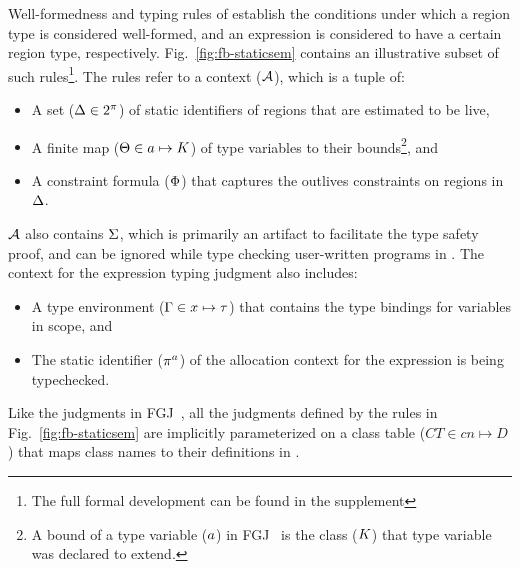 Well-formedness and typing rules of \fbname establish the conditions
under which a region type is considered well-formed, and an expression
is considered to have a certain region type, respectively.
Fig.~\ref{fig:fb-staticsem} contains an illustrative subset of such
rules\footnote{The full formal development can be found in the
supplement}. The rules refer to a context (${\mathcal{A}}$), which is a tuple of:
\begin{itemize}
\item A set ($\Delta \in 2^\pi$) of static identifiers of regions
that are estimated to be live,
\item A finite map ($\Theta \in a \mapsto K$) of type
variables to their bounds\footnote{A bound of a type variable
($a$) in FGJ~\cite{fgj} is the class ($K$) that type variable
was declared to extend.}, and
\item A constraint formula ($\Phi$) that captures the outlives
constraints on regions in $\Delta$.
\end{itemize}
${\mathcal{A}}$ also contains $\Sigma$, 
which is primarily an artifact to facilitate the type safety proof,
and can be ignored while type checking user-written programs
in \FB. The context for the expression typing judgment also includes:
\begin{itemize}
\item A type environment ($\Gamma \in x \mapsto \tau$) that contains the
type bindings for variables in scope, and 
\item The static identifier ($\pi^a$) of the allocation context for
the expression is being typechecked.  
\end{itemize}
Like the judgments in FGJ~\cite{fgj}, all the judgments defined by the
rules in Fig.~\ref{fig:fb-staticsem} are implicitly parameterized on a
class table ($CT \in cn \mapsto D$) that maps class names to their
definitions in \FB.


